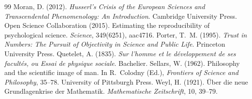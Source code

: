 \documentclass{situationist-preprint}
\begin{document}
\begin{thebibliography}{99}
 Moran, D. (2012). \emph{Husserl's Crisis of the European Sciences and Transcendental Phenomenology: An Introduction}. Cambridge University Press.
 Open Science Collaboration (2015). Estimating the reproducibility of psychological science. \emph{Science}, 349(6251), aac4716.
 Porter, T.~M. (1995). \emph{Trust in Numbers: The Pursuit of Objectivity in Science and Public Life}. Princeton University Press.
 Quetelet, A. (1835). \emph{Sur l'homme et le développement de ses facultés, ou Essai de physique sociale}. Bachelier.
 Sellars, W. (1962). Philosophy and the scientific image of man. In R.~Colodny (Ed.), \emph{Frontiers of Science and Philosophy}, 35--78. University of Pittsburgh Press.
 Weyl, H. (1921). Über die neue Grundlagenkrise der Mathematik. \emph{Mathematische Zeitschrift}, 10, 39--79.
\end{thebibliography}
\end{document}

